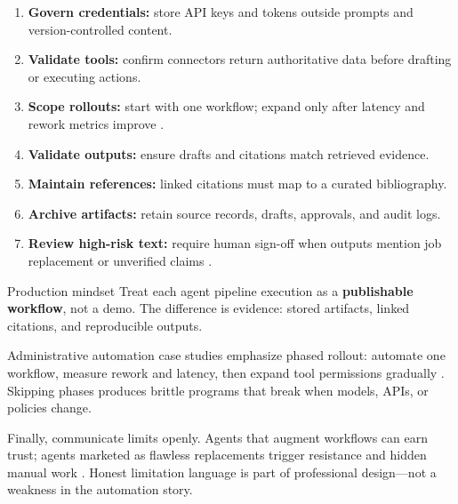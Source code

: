 \begin{enumerate}
  \item \textbf{Govern credentials:} store API keys and tokens outside prompts and
    version-controlled content.
  \item \textbf{Validate tools:} confirm connectors return authoritative data before
    drafting or executing actions.
  \item \textbf{Scope rollouts:} start with one workflow; expand only after latency and
    rework metrics improve \cite{recomaijobroles}.
  \item \textbf{Validate outputs:} ensure drafts and citations match retrieved evidence.
  \item \textbf{Maintain references:} linked citations must map to a curated bibliography.
  \item \textbf{Archive artifacts:} retain source records, drafts, approvals, and audit logs.
  \item \textbf{Review high-risk text:} require human sign-off when outputs mention job
    replacement or unverified claims \cite{redditcomplextasks}.
\end{enumerate}

\begin{insightbox}{Production mindset}
Treat each agent pipeline execution as a \textbf{publishable workflow}, not a demo. The
difference is evidence: stored artifacts, linked citations, and reproducible outputs.
\end{insightbox}

Administrative automation case studies emphasize phased rollout: automate one workflow,
measure rework and latency, then expand tool permissions gradually
\cite{recomaijobroles}. Skipping phases produces brittle programs that break when models,
APIs, or policies change.

Finally, communicate limits openly. Agents that augment workflows can earn trust; agents
marketed as flawless replacements trigger resistance and hidden manual work
\cite{mediumworkflowagents,redditcomplextasks}. Honest limitation language is part of
professional design---not a weakness in the automation story.
